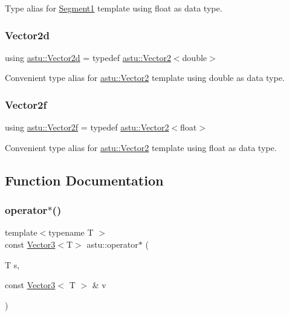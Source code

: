 Type alias for \hyperlink{classastu_1_1Segment1}{Segment1} template using float as data type. \mbox{\label{namespaceastu_ac96b7e49cebcbe77f063023a07785e92}} 
\subsubsection{\texorpdfstring{Vector2d}{Vector2d}}
{\footnotesize\ttfamily using \hyperlink{namespaceastu_ac96b7e49cebcbe77f063023a07785e92}{astu\+::\+Vector2d} = typedef \hyperlink{classastu_1_1Vector2}{astu\+::\+Vector2}$<$double$>$}

Convenient type alias for \hyperlink{classastu_1_1Vector2}{astu\+::\+Vector2} template using double as data type. \mbox{\label{namespaceastu_ad97a0a61e8cfa5a6a84a72d93eea2491}} 
\subsubsection{\texorpdfstring{Vector2f}{Vector2f}}
{\footnotesize\ttfamily using \hyperlink{namespaceastu_ad97a0a61e8cfa5a6a84a72d93eea2491}{astu\+::\+Vector2f} = typedef \hyperlink{classastu_1_1Vector2}{astu\+::\+Vector2}$<$float$>$}

Convenient type alias for \hyperlink{classastu_1_1Vector2}{astu\+::\+Vector2} template using float as data type. 

\subsection{Function Documentation}
\mbox{\label{namespaceastu_a758ac6ac57c86535b599271149ab9c1b}} 
\subsubsection{\texorpdfstring{operator$\ast$()}{operator*()}\hspace{0.1cm}{\footnotesize\ttfamily [1/2]}}
{\footnotesize\ttfamily template$<$typename T $>$ \\
const \hyperlink{classastu_1_1Vector3}{Vector3}$<$T$>$ astu\+::operator$\ast$ (\begin{DoxyParamCaption}\item[{T}]{s,  }\item[{const \hyperlink{classastu_1_1Vector3}{Vector3}$<$ T $>$ \&}]{v }\end{DoxyParamCaption})}

